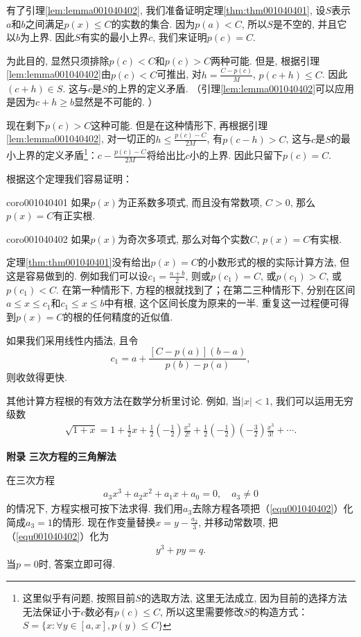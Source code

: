 有了引理\ref{lem:lemma001040402}, 我们准备证明定理\ref{thm:thm001040401}, 设$S$表示$a$和$b$之间满足$p(x) \le C$的实数的集合. 因为$p(a) < C$, 所以$S$是不空的, 并且它以$b$为上界. 因此$S$有实的最小上界$c$, 我们来证明$p(c)=C$. 

为此目的, 显然只须排除$p(c)<C$和$p(c)>C$两种可能. 但是, 根据引理\ref{lem:lemma001040402}由$p(c)<C$可推出, 对$h=\frac{C-p(c)}{M}$, $p(c+h) \le C$. 因此$(c+h) \in S$. 这与$c$是$S$的上界的定义矛盾. （引理\ref{lem:lemma001040402}可以应用是因为$c+h \ge b$显然是不可能的. ）

现在剩下$p(c)>C$这种可能. 但是在这种情形下, 再根据引理\ref{lem:lemma001040402}, 对一切正的$h \le \frac{p(c)-C}{2M}$, 有$p(c-h)>C$, 这与$c$是$S$的最小上界的定义矛盾\footnote{这里似乎有问题, 按照目前$S$的选取方法, 这里无法成立, 因为目前的选择方法无法保证小于$c$数必有$p(c)\le C$, 所以这里需要修改$S$的构造方式：$S=\{x:\forall y \in [a, x], p(y) \le C\}$}：$c - \frac{p(c)-C}{2M}$将给出比$c$小的上界. 因此只留下$p(c)=C$. 

根据这个定理我们容易证明：
\begin{corollary}{}{coro001040401}
如果$p(x)$为正系数多项式, 而且没有常数项, $C > 0$, 那么$p(x)=C$有正实根. 
\end{corollary}

\begin{corollary}{}{coro001040402}
如果$p(x)$为奇次多项式, 那么对每个实数$C$, $p(x)=C$有实根. 
\end{corollary}

定理\ref{thm:thm001040401}没有给出$p(x)=C$的小数形式的根的实际计算方法, 但这是容易做到的. 例如我们可以设$c_1 = \frac{a+b}{2}$, 则或$p(c_1) = C$, 或$p(c_1) > C$, 或$p(c_1) < C$. 在第一种情形下, 方程的根就找到了；在第二三种情形下, 分别在区间$a \le x \le c_1$和$c_1 \le x \le b$中有根, 这个区间长度为原来的一半. 重复这一过程便可得到$p(x)=C$的根的任何精度的近似值. 

如果我们采用线性内插法, 且令
\[
c_1 = a + \frac{[C-p(a)](b-a)}{p(b)-p(a)},
\]
则收敛得更快. 

其他计算方程根的有效方法在数学分析里讨论. 例如, 当$|x|<1$, 我们可以运用无穷级数
\begin{gather}\label{equ001040401}
\sqrt{1+x} = 1 + \frac{1}{2}x + \frac{1}{2}(-\frac{1}{2})\frac{x^2}{2!}+\frac{1}{2}(-\frac{1}{2})(-\frac{3}{2})\frac{x^3}{3!}+\cdots.
\end{gather}

\textbf{附录} \quad \textbf{三次方程的三角解法}

在三次方程
\begin{gather}\label{equ001040402}
a_3x^3+a_2x^2+a_1x+a_0=0,\quad a_3 \neq 0
\end{gather}
的情况下, 方程实根可按下法求得. 我们用$a_3$去除方程各项把（\ref{equ001040402}）化简成$a_3=1$的情形. 现在作变量替换$x=y-\frac{a_2}{3}$, 并移动常数项, 把（\ref{equ001040402}）化为
\begin{gather}\label{equ001040403}
y^3+py=q.
\end{gather}
当$p=0$时, 答案立即可得. 

